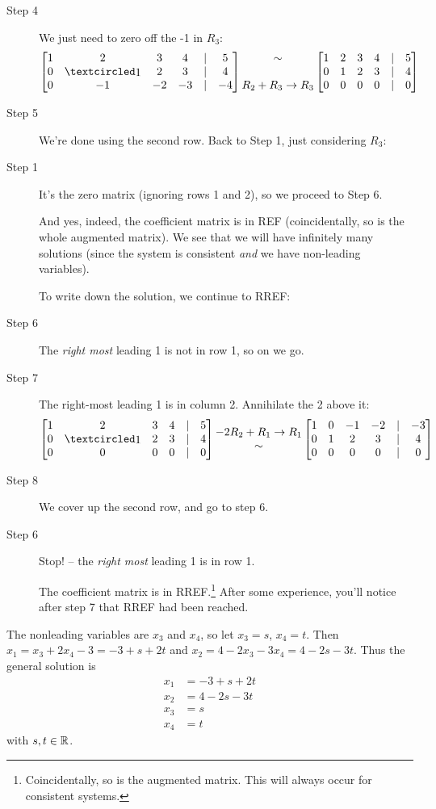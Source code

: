 \begin{myexample}
\begin{description}
\item[Step 4]  We just need to zero off the -1 in $R_3$:
$$\mat{
1 & 2 & 3 & 4 &|& 5\\
0 & \pivot & 2 & 3 &|& 4\\
0 & -1 & -2 & -3 & |& -4}
\mt{\sim \\ \\ R_2+R_3\to R_3}
\mat{
1 & 2 & 3 & 4 &|& 5\\
0 & 1 & 2 & 3 &|& 4\\
0 & 0 & 0 & 0 & |& 0}
$$
\item[Step 5] We're  done using the second row.  Back to Step 1, just considering $R_3$:

\item[Step 1] It's the zero matrix (ignoring rows 1 and 2), so we proceed to Step 6.

And yes, indeed, the coefficient matrix is in REF (coincidentally, so is the whole augmented matrix).
We see that we will have infinitely many solutions (since the system
is consistent {\it and} we have non-leading variables).

To write down the solution, we continue to RREF:

\item[Step 6] The {\it right most} leading 1 is not in row 1, so on we go.

\item[Step 7] The right-most leading 1 is in column 2.  Annihilate the 2 above it:
$$\mat{
1 & 2 & 3 & 4 &|& 5\\
0 & \pivot & 2 & 3 &|& 4\\
0 & 0 & 0 & 0 & |& 0}
\mt{-2R_2+R_1\to R_1\\ \sim \\ }
\mat{
1 & 0 & -1 & -2 &|& -3\\
0 & 1 & 2 & 3 &|& 4\\
0 & 0 & 0 & 0 & |& 0}
$$

\item[Step 8] We cover up the second row, and go to step 6.

\item[Step 6] Stop! -- the  {\it right most} leading 1 is in row 1.


The coefficient matrix is in RREF.\footnote{Coincidentally, so is the augmented matrix. This will always occur for consistent systems.} After some experience, you'll notice after step 7 that RREF had been reached. 
\end{description}
 

The nonleading variables are $x_3$ and $x_4$, so 
let $x_3 = s$, $x_4 = t$.  Then $x_1 = x_3+2x_4-3 = -3+s+2t$ and
$x_2 = 4-2x_3-3x_4 = 4-2s-3t$.  Thus the general solution is
\begin{align*}
x_1 &= -3+s+2t\\
x_2 &= 4-2s-3t\\
x_3 &= s \\
x_4 &= t
\end{align*}
with $s,t \in \mathbb{R}$.  
\end{myexample}


